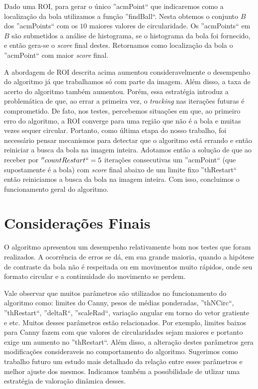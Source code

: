 \documentclass[11pt,a4paper]{article}
\begin{document}
 Dado uma ROI, para gerar o único ''acmPoint`` que indicaremos como a localização da bola utilizamos a função ''findBall``. Nesta obtemos o conjunto $B$ dos ''acmPoints`` com os $10$ maiores valores de circularidade. Os ''acmPoints`` em $B$ são submetidos a análise de histograma, se o histograma da bola foi fornecido, e então gera-se o \textit{score} final destes. Retornamos como localização da bola o ''acmPoint`` com maior \textit{score} final.

 A abordagem de ROI descrita acima aumentou consideravelmente o desempenho do algoritmo já que trabalhamos só com parte da imagem. Além disso, a taxa de acerto do algoritmo também aumentou. Porém, essa estratégia introduz a problemática de que, ao errar a primeira vez, o \textit{tracking} nas iterações futuras é comprometido. De fato, nos testes, percebemos situações em que, ao primeiro erro do algoritmo, a ROI converge para uma região que não é a bola e muitas vezes sequer circular. Portanto, como última etapa do nosso trabalho, foi necessário pensar mecanismos para detectar que o algoritmo está errando e então reiniciar a busca da bola na imagem inteira. Adotamos então a solução de que ao receber por $''countRestart``=5$ iterações consecutivas um ''acmPoint`` (que supostamente é a bola) com \textit{score} final abaixo de um limite fixo ''thRestart`` então reiniciamos a busca da bola na imagem inteira. Com isso, concluimos o funcionamento geral do algoritmo.


\section{Considerações Finais}
 O algoritmo apresentou um desempenho relativamente bom nos testes que foram realizados. A ocorrência de erros se dá, em sua grande maioria, quando a hipótese de contraste da bola não é respeitada ou em movimentos muito rápidos, onde seu formato circular e a continuidade do movimento se perdem.

 Vale observar que muitos parâmetros são utilizados no funcionamento do algoritmo como: limites do Canny, pesos de médias ponderadas, ''thNCirc``, ''thRestart``, ''deltaR``, ''scaleRad``, variação angular em torno do vetor gratiente e etc. Muitos desses parâmetros estão relacionados. Por exemplo, limites baixos para Canny fazem com que valores de circularidades sejam maiores e portanto exige um aumento no ''thRestart``. Além disso, a alteração destes parâmetros gera modificações consideraveis no comportamento do algoritmo. Sugerimos como trabalho futuro um estudo mais detalhado da relação entre esses parâmetros e melhor ajuste dos mesmos. Indicamos também a possibilidade de utlizar uma estratégia de valoração dinâmica desses.
\end{document}

